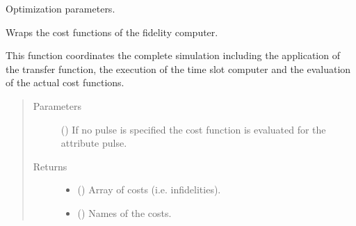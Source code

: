 \documentclass[letterpaper,10pt,english]{sphinxmanual}
\begin{document}
\begin{fulllineitems}
\begin{fulllineitems}
\label{\detokenize{qsim:qsim.simulator.Simulator.pulse}}
Optimization parameters.

\end{fulllineitems}


\begin{fulllineitems}
\label{\detokenize{qsim:qsim.simulator.Simulator.wrapped_cost_functions}}
Wraps the cost functions of the fidelity computer.

This function coordinates the complete simulation including the
application of the transfer function, the execution of the time
slot computer and the evaluation of the actual cost functions.
\begin{quote}\begin{description}
\item[{Parameters}] \leavevmode
{} () \textendash{} If no pulse is specified the cost function is evaluated for the
attribute pulse.

\item[{Returns}] \leavevmode
\begin{itemize}
\item {} 
 () \textendash{} Array of costs (i.e. infidelities).

\item {} 
 () \textendash{} Names of the costs.

\end{itemize}


\end{description}\end{quote}

\end{fulllineitems}



\end{fulllineitems}
\end{document}
